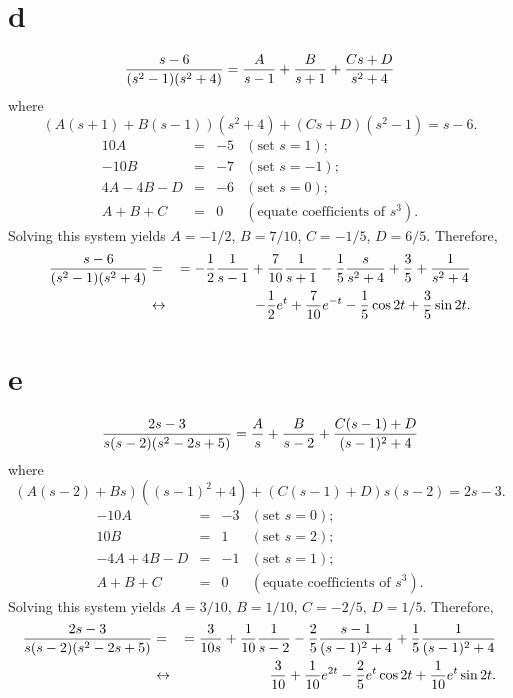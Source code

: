 \documentclass[dvips]{book}
\numberwithin{example}{section}
\numberwithin{equation}{section}
\numberwithin{theorem}{section}
\numberwithin{table}{section}
\numberwithin{figure}{section}
\begin{document}
\part{d}
$$
{s-6\over(s^2-1)(s^2+4)}
={A\over s-1}+{B\over s+1}+{Cs+D\over s^2+4}
$$
where
$$
(A(s+1)+B(s-1))(s^2+4)+(Cs+D)(s^2-1)=s-6.
$$
$$
\begin{array}{rcrl}
10A&=&-5&(\mbox{set }s=1);\\
-10B&=&-7& (\mbox{set }s=-1);\\
4A-4B-D&=&-6& (\mbox{set }s=0);\\
A+B+C&=&0&(\mbox{equate coefficients of }s^3).
\end{array}
$$
Solving this system yields $A=-1/2$, $B=7/10$,
$C=-1/5$, $D=6/5$. Therefore,
\begin{eqnarray*}
{s-6\over(s^2-1)(s^2+4)}
&=&
=-{1\over2}{1\over s-1}+{7\over 10}{1\over s+1}-{1\over5}{s\over s^2+4}
+{3\over5}+{1\over s^2+4}
\\&\leftrightarrow&
-{1\over2}e^t+{7\over 10}e^{-t}-{1\over5}\cos 2t+{3\over5}\sin 2t.
\end{eqnarray*}

\part{e}
$$
{2s-3\over s(s-2)(s^2-2s+5)}
={A\over s}+{B\over s-2}+{C(s-1)+D\over(s-1)^2+4}
$$
where
$$
(A(s-2)+Bs)((s-1)^2+4)+(C(s-1)+D)s(s-2)=2s-3.
$$
$$
\begin{array}{rcrl}
-10A&=&-3&(\mbox{set }s=0);\\
10B&=&1& (\mbox{set }s=2);\\
-4A+4B-D&=&-1& (\mbox{set }s=1);\\
A+B+C&=&0&(\mbox{equate coefficients of }s^3).
\end{array}
$$
Solving this system yields $A=3/10$, $B=1/10$,
$C=-2/5$, $D=1/5$. Therefore,
\begin{eqnarray*}
{2s-3\over s(s-2)(s^2-2s+5)}
&=&
={3\over 10s}+{1\over 10}{1\over s-2}-{2\over5}{s-1\over(s-1)^2+4}
+{1\over 5}{1\over(s-1)^2+4}
\\&\leftrightarrow&
{3\over 10}+{1\over 10}e^{2t}-{2\over5}e^t\cos 2t
+{1\over 10}e^t\sin2t.
\end{eqnarray*}
\end{document}
